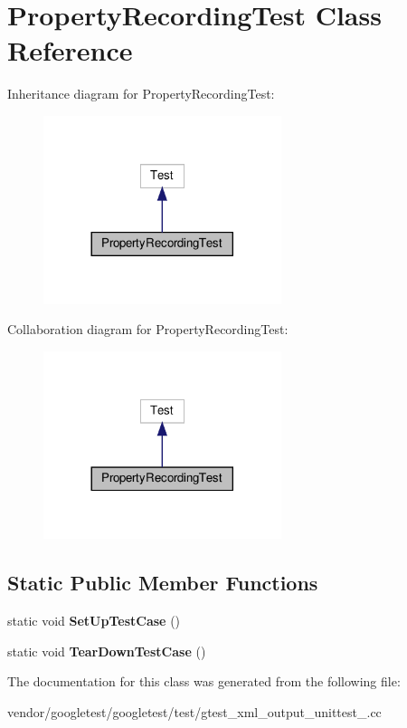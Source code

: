 \hypertarget{class_property_recording_test}{}\section{Property\+Recording\+Test Class Reference}
\label{class_property_recording_test}


Inheritance diagram for Property\+Recording\+Test\+:
\nopagebreak
\begin{figure}[H]
\begin{center}
\leavevmode
\includegraphics[width=197pt]{class_property_recording_test__inherit__graph}
\end{center}
\end{figure}


Collaboration diagram for Property\+Recording\+Test\+:
\nopagebreak
\begin{figure}[H]
\begin{center}
\leavevmode
\includegraphics[width=197pt]{class_property_recording_test__coll__graph}
\end{center}
\end{figure}
\subsection*{Static Public Member Functions}
\begin{DoxyCompactItemize}
\item 
\mbox{\label{class_property_recording_test_a673c9dfcd9f0c8d10d0df765852c1669}} 
static void {\bfseries Set\+Up\+Test\+Case} ()
\item 
\mbox{\label{class_property_recording_test_ac0d2d47efbdc4399777dffca6071d15d}} 
static void {\bfseries Tear\+Down\+Test\+Case} ()
\end{DoxyCompactItemize}


The documentation for this class was generated from the following file\+:\begin{DoxyCompactItemize}
\item 
vendor/googletest/googletest/test/gtest\+\_\+xml\+\_\+output\+\_\+unittest\+\_\+.\+cc\end{DoxyCompactItemize}
